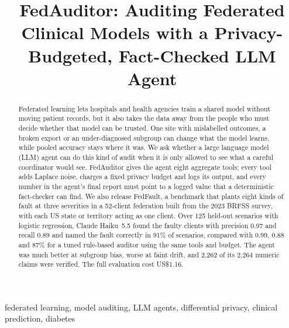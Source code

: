 \documentclass[conference]{IEEEtran}
\begin{document}
\title{FedAuditor: Auditing Federated Clinical Models with a Privacy-Budgeted, Fact-Checked LLM Agent}

\author{
}

\maketitle

\begin{abstract}
Federated learning lets hospitals and health agencies train a shared model without moving patient
records, but it also takes the data away from the people who must decide whether that model can be
trusted. One site with mislabelled outcomes, a broken export or an under-diagnosed subgroup can
change what the model learns, while pooled accuracy stays where it was. We ask whether a large
language model (LLM) agent can do this kind of audit when it is only allowed to see what a careful
coordinator would see. FedAuditor gives the agent eight aggregate tools; every tool adds Laplace
noise, charges a fixed privacy budget and logs its output, and every number in the agent's final
report must point to a logged value that a deterministic fact-checker can find. We also release
FedFault, a benchmark that plants eight kinds of fault at three severities in a 52-client federation
built from the 2023 BRFSS survey, with each US state or territory acting as one client. Over 125
held-out scenarios with logistic regression, Claude Haiku~5.5 found the faulty clients with
precision 0.97 and recall 0.89 and named the fault correctly in 91\% of scenarios, compared with
0.99, 0.88 and 87\% for a tuned rule-based auditor using the same tools and budget. The agent was
much better at subgroup bias, worse at faint drift, and 2{,}262 of its 2{,}264 numeric claims were
verified. The full evaluation cost US\$1.16.
\end{abstract}

\begin{IEEEkeywords}
federated learning, model auditing, LLM agents, differential privacy, clinical prediction, diabetes
\end{IEEEkeywords}

\end{document}
